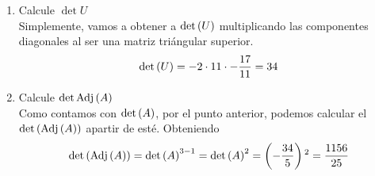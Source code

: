 \begin{enumerate}[label=\listAlph]
        \item Calcule \(\det U\) \\
            Simplemente, vamos a obtener a \(\text{det} \left( U \right)\) multiplicando las componentes diagonales al ser una matriz triángular superior.
            \[
                \text{det} \left( U \right) =
                -2 \cdot 11 \cdot -\frac{17}{11} =
                34
            \]
        \item Calcule \(\det \text{Adj}\left(A\right)\) \\
            Como contamos con \(\text{det} \left( A \right)\), por el punto anterior, podemos calcular el \(\text{det} \left( \text{Adj} \left( A \right) \right)\) apartir de esté. Obteniendo
            \[
                \text{det} \left( \text{Adj} \left( A \right) \right)
                =
                \text{det} \left( A \right)^{3 - 1}
                =
                \text{det} \left( A \right)^2
                =
                \left(-\frac{34}{5}\right){}^2
                =
                \frac{1156}{25}
            \]
    \end{enumerate}
